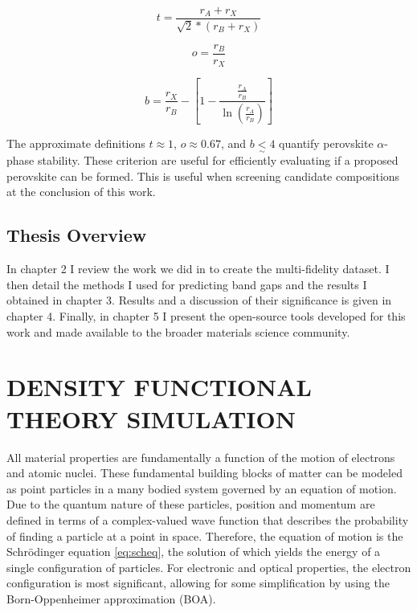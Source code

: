 \begin{equation}
\label{eq:t}
t = \frac{r_A+r_X}{\sqrt{2}*(r_B+r_X)}
\end{equation}

\begin{equation}
\label{eq:o}
o=\frac{r_B}{r_X}
\end{equation}

\begin{equation}
\label{eq:b}
b = \frac{r_X}{r_B}-\left[ 1-\frac{\frac{r_A}{r_B}}{\ln(\frac{r_A}{r_B})} \right]
\end{equation}

The approximate definitions \(t \approx 1\), \(o \approx 0.67\), and \(b \underset{\sim}{<} 4\) quantify perovskite \(\alpha\)-phase stability.
\autocite{yin-2015-halid-perov,bartel-2019-new-toler}
These criterion are useful for efficiently evaluating if a proposed perovskite can be formed.
This is useful when screening candidate compositions at the conclusion of this work.

\section{Thesis Overview}
\label{sec:orgd7d6c18}
In chapter 2 I review the work we did in  to create the multi-fidelity dataset.
I then detail the methods I used for predicting band gaps and the results I obtained in chapter 3.
Results and a discussion of their significance is given in chapter 4.
Finally, in chapter 5 I present the open-source tools developed for this work and made available to the broader materials science community.

\chapter{DENSITY FUNCTIONAL THEORY SIMULATION}
\label{sec:org6ea6d24}
All material properties are fundamentally a function of the motion of electrons and atomic nuclei.
These fundamental building blocks of matter can be modeled as point particles in a many bodied system governed by an equation of motion.
Due to the quantum nature of these particles, position and momentum are defined in terms of a complex-valued wave function that describes the probability of finding a particle at a point in space.
Therefore, the equation of motion is the Schrödinger equation \eqref{eq:scheq}, the solution of which yields the energy of a single configuration of particles.
For electronic and optical properties, the electron configuration is most significant, allowing for some simplification by using the Born-Oppenheimer approximation (BOA).

